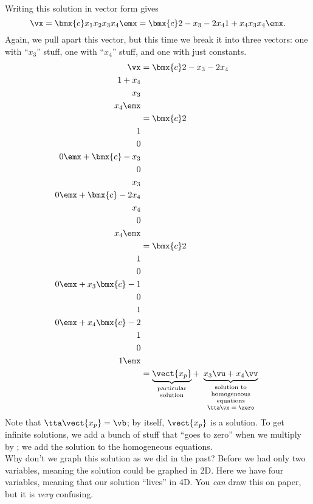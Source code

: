 {Writing this solution in vector form gives 
\[
\vx = \bmx{c}x_1\\x_2\\x_3\\x_4\emx = \bmx{c}2-x_3-2x_4\\1+x_4\\x_3\\x_4\emx.
\]
Again, we pull apart this vector, but this time we break it into three vectors: one with ``$x_3$'' stuff, one with ``$x_4$'' stuff, and one with just constants. 
\begin{align*}
 \vx &= \bmx{c}2-x_3-2x_4\\1+x_4\\x_3\\x_4\emx \\
     &= \bmx{c}2\\1\\0\\0\emx + \bmx{c}-x_3\\0\\x_3\\0\emx + \bmx{c}-2x_4\\x_4\\0\\x_4\emx \\ 
     &=\bmx{c}2\\1\\0\\0\emx+x_3\bmx{c}-1\\0\\1\\0\emx + x_4\bmx{c}-2\\1\\0\\1\emx\\
     &=\underbrace{\vect{x_p}}_{\parbox{35pt}{\center {\vskip -10 pt} \scriptsize particular solution}}+\underbrace{x_3\vu + x_4\vv}_{\parbox{70pt}{\center {\vskip -10 pt} \scriptsize solution to homogeneous equations $\tta\vx=\zero$}}
\end{align*}
Note that $\tta\vect{x_p} = \vb$; by itself, $\vect{x_p}$ is a solution. To get infinite solutions, we add a bunch of stuff that ``goes to zero'' when we multiply by \tta; we add the solution to the homogeneous equations.\\

Why don't we graph this solution as we did in the past? Before we had only two variables, meaning the solution could be graphed in 2D. Here we have four variables, meaning that our solution ``lives'' in 4D. You \textit{can} draw this on paper, but it is \textit{very} confusing.}


